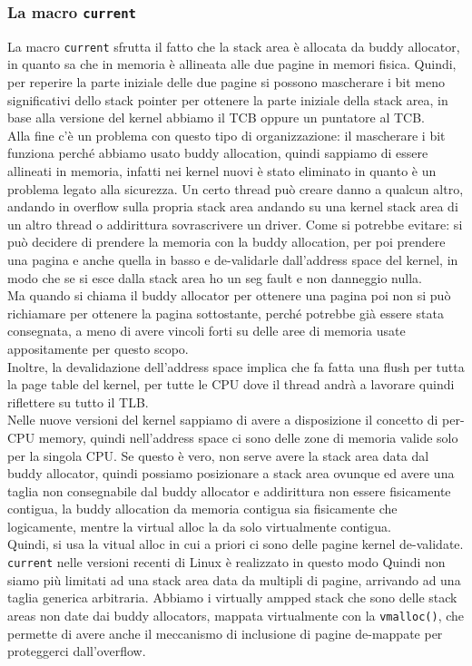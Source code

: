 \documentclass[12pt, oneside]{extbook}
\begin{document}
\subsubsection{La macro \texttt{current}}
La macro \texttt{current} sfrutta il fatto che la stack area è allocata da buddy allocator, in quanto sa che in memoria è allineata alle due pagine in memori fisica. Quindi, per reperire la parte iniziale delle due pagine si possono mascherare i bit meno significativi dello stack pointer per ottenere la parte iniziale della stack area, in base alla versione del kernel abbiamo il TCB oppure un puntatore al TCB.\\Alla fine c'è un problema con questo tipo di organizzazione: il mascherare i bit funziona perché abbiamo usato buddy allocation, quindi sappiamo di essere allineati in memoria, infatti nei kernel nuovi è stato eliminato in quanto è un problema legato alla sicurezza. Un certo thread può creare danno a qualcun altro, andando in overflow sulla propria stack area andando su una kernel stack area di un altro thread o addirittura sovrascrivere un driver. Come si potrebbe evitare: si può decidere di prendere la memoria con la buddy allocation, per poi prendere una pagina e anche quella in basso e de-validarle dall'address space del kernel, in modo che se si esce dalla stack area ho un seg fault e non danneggio nulla.\\Ma quando si chiama il buddy allocator per ottenere una pagina poi non si può richiamare per ottenere la pagina sottostante, perché potrebbe già essere stata consegnata, a meno di avere vincoli forti su delle aree di memoria usate appositamente per questo scopo.\\Inoltre, la devalidazione dell'address space implica che fa fatta una flush per tutta la page table del kernel, per tutte le CPU dove il thread andrà a lavorare quindi riflettere su tutto il TLB.\\Nelle nuove versioni del kernel sappiamo di avere a disposizione il concetto di per-CPU memory, quindi nell'address space ci sono delle zone di memoria valide solo per la singola CPU. Se questo è vero, non serve avere la stack area data dal buddy allocator, quindi possiamo posizionare a stack area ovunque ed avere una taglia non consegnabile dal buddy allocator e addirittura non essere fisicamente contigua, la buddy allocation da memoria contigua sia fisicamente che logicamente, mentre la virtual alloc la da solo virtualmente contigua.\\Quindi, si usa la vitual alloc in cui a priori ci sono delle pagine kernel de-validate.\\ \texttt{current} nelle versioni recenti di Linux è realizzato in questo modo
Quindi non siamo più limitati ad una stack area data da multipli di pagine, arrivando ad una taglia generica arbitraria. Abbiamo i virtually ampped stack che sono delle stack areas non date dai buddy allocators, mappata virtualmente con la \texttt{vmalloc()}, che permette di avere anche il meccanismo di inclusione di pagine de-mappate per proteggerci dall'overflow.
\end{document}
